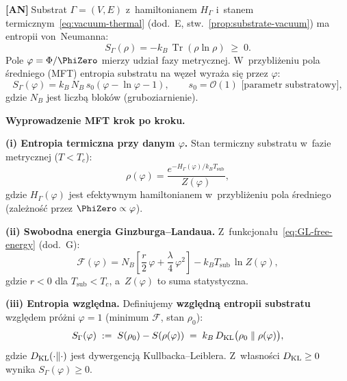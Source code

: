 \begin{chain}\label{chain:A19}
\textbf{[AN]}$\;$Substrat $\Gamma = (V, E)$ z~hamiltonianem
$H_\Gamma$ i~stanem termicznym~\eqref{eq:vacuum-thermal}
(dod.~E, stw.~\ref{prop:substrate-vacuum}) ma entropii
von~Neumanna:
\begin{equation}\label{eq:H-entropy-vonN}
  S_\Gamma(\rho)
  = -k_B\,\operatorname{Tr}(\rho\ln\rho)
  \;\geq\; 0.
\end{equation}
Pole $\varphi = \Phi/\PhiZero$ mierzy udzia\l{} fazy metrycznej.
W~przybli\.zeniu pola \'sredniego (MFT) entropia substratu
na w\k{e}ze\l{} wyra\.za si\k{e} przez $\varphi$:
\begin{equation}\label{eq:H-N07}
  \boxed{
  S_\Gamma(\varphi)
  = k_B\,N_B\,s_0\!\left(\varphi - \ln\varphi - 1\right),
  }
  \qquad s_0 = \mathcal{O}(1)\text{ [parametr substratowy]},
\end{equation}
gdzie $N_B$ jest liczb\k{a} blok\'ow (gruboziarnienie).

\medskip
\noindent\textbf{Wyprowadzenie MFT krok po kroku.}

\textbf{(i) Entropia termiczna przy danym $\varphi$.}
Stan termiczny substratu w~fazie metrycznej ($T < T_c$):
\begin{equation}\label{eq:rho-mft}
  \rho(\varphi) = \frac{e^{-H_\Gamma(\varphi)/k_B T_\mathrm{sub}}}
  {Z(\varphi)},
\end{equation}
gdzie $H_\Gamma(\varphi)$ jest efektywnym hamiltonianem
w~przybli\.zeniu pola \'sredniego (zale\.zno\'s\'c przez $\PhiZero \propto \varphi$).

\textbf{(ii) Swobodna energia Ginzburga--Landaua.}
Z~funkcjona\l{}u~\eqref{eq:GL-free-energy} (dod.~G):
\begin{equation}\label{eq:F-phi-mft}
  \mathcal{F}(\varphi)
  = N_B\!\left[\frac{r}{2}\,\varphi + \frac{\lambda}{4}\,\varphi^2\right]
  - k_B T_\mathrm{sub}\,\ln Z(\varphi),
\end{equation}
gdzie $r < 0$ dla $T_\mathrm{sub} < T_c$, a~$Z(\varphi)$
to suma statystyczna.

\textbf{(iii) Entropia wzgl\k{e}dna.}
Definiujemy \textbf{wzgl\k{e}dn\k{a} entropii substratu}
wzgl\k{e}dem pr\'o\.zni $\varphi = 1$
(minimum $\mathcal{F}$, stan $\rho_0$):
\begin{equation}\label{eq:S-rel-def}
  S_\Gamma(\varphi) \;:=\; S(\rho_0) - S(\rho(\varphi))
  \;=\; k_B\,D_{\rm KL}\bigl(\rho_0\;\|\;\rho(\varphi)\bigr),
\end{equation}
gdzie $D_{\rm KL}(\cdot\|\cdot)$ jest dywergencj\k{a}
Kullbacka--Leiblera. Z~w\l{}asno\'sci $D_{\rm KL} \geq 0$
wynika $S_\Gamma(\varphi) \geq 0$.


\end{chain}
